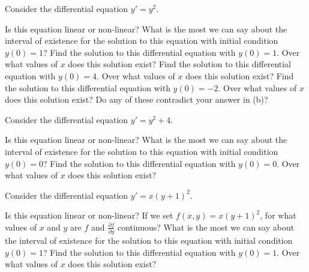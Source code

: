\documentclass{ximera}
\begin{document}
\begin{exercise}
    Consider the differential equation $y' = y^2$. 
    \begin{tasks}
        \task Is this equation linear or non-linear?
        \task What is the most we can say about the interval of existence for the solution to this equation with initial condition $y(0) = 1$?
        \task Find the solution to this differential equation with $y(0) = 1$. Over what values of $x$ does this solution exist?
        \task Find the solution to this differential equation with $y(0) = 4$. Over what values of $x$ does this solution exist?
        \task Find the solution to this differential equation with $y(0) = -2$. Over what values of $x$ does this solution exist?
        \task Do any of these contradict your answer in (b)? 
    \end{tasks}
\end{exercise}

\begin{exercise}
    Consider the differential equation $y' = y^2 + 4$. 
    \begin{tasks}
        \task Is this equation linear or non-linear?
        \task What is the most we can say about the interval of existence for the solution to this equation with initial condition $y(0) = 0$?
        \task Find the solution to this differential equation with $y(0) = 0$. Over what values of $x$ does this solution exist?
    \end{tasks}
\end{exercise}

\begin{exercise}
    Consider the differential equation $y' = x(y+1)^2$. 
    \begin{tasks}
        \task Is this equation linear or non-linear?
        \task If we set $f(x,y) = x(y+1)^2$, for what values of $x$ and $y$ are $f$ and $\frac{\partial f}{\partial y}$ continuous?
        \task What is the most we can say about the interval of existence for the solution to this equation with initial condition $y(0) = 1$?
        \task Find the solution to this differential equation with $y(0) = 1$. Over what values of $x$ does this solution exist?
    \end{tasks}
\end{exercise}
\end{document}
